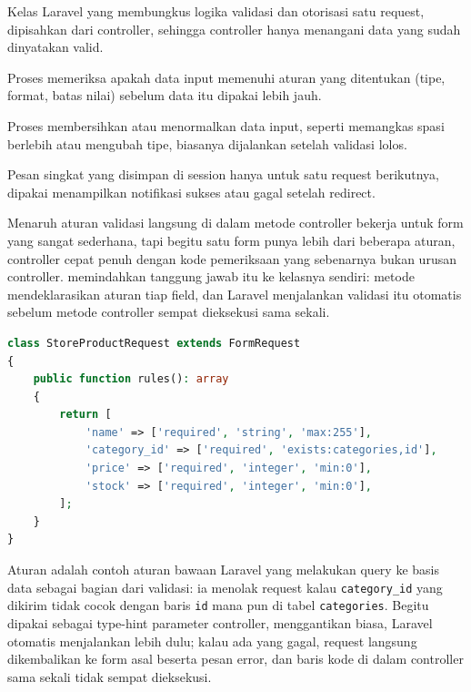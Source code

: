 \begin{istilahpenting}
\begin{description}[leftmargin=0pt,style=nextline]
  \item[FormRequest] Kelas Laravel yang membungkus logika validasi dan otorisasi satu request, dipisahkan dari controller, sehingga controller hanya menangani data yang sudah dinyatakan valid.
  \item[Validasi] Proses memeriksa apakah data input memenuhi aturan yang ditentukan (tipe, format, batas nilai) sebelum data itu dipakai lebih jauh.
  \item[Sanitasi] Proses membersihkan atau menormalkan data input, seperti memangkas spasi berlebih atau mengubah tipe, biasanya dijalankan setelah validasi lolos.
  \item[Flash Message] Pesan singkat yang disimpan di session hanya untuk satu request berikutnya, dipakai menampilkan notifikasi sukses atau gagal setelah redirect.
\end{description}
\end{istilahpenting}

Menaruh aturan validasi langsung di dalam metode controller bekerja
untuk form yang sangat sederhana, tapi begitu satu form punya lebih dari
beberapa aturan, controller cepat penuh dengan kode pemeriksaan yang
sebenarnya bukan urusan controller.  memindahkan
tanggung jawab itu ke kelasnya sendiri: metode 
mendeklarasikan aturan tiap field, dan Laravel menjalankan validasi itu
otomatis sebelum metode controller sempat dieksekusi sama sekali.

\begin{lstlisting}[language=php, title=\lstfile{app/Http/Requests/StoreProductRequest.php}]
class StoreProductRequest extends FormRequest
{
    public function rules(): array
    {
        return [
            'name' => ['required', 'string', 'max:255'],
            'category_id' => ['required', 'exists:categories,id'],
            'price' => ['required', 'integer', 'min:0'],
            'stock' => ['required', 'integer', 'min:0'],
        ];
    }
}
\end{lstlisting}

Aturan  adalah contoh aturan bawaan
Laravel yang melakukan query ke basis data sebagai bagian dari
validasi: ia menolak request kalau \texttt{category\_id} yang dikirim
tidak cocok dengan baris \texttt{id} mana pun di tabel
\texttt{categories}. Begitu  dipakai
sebagai type-hint parameter controller, menggantikan 
biasa, Laravel otomatis menjalankan  lebih dulu; kalau
ada yang gagal, request langsung dikembalikan ke form asal beserta pesan
error, dan baris kode di dalam controller sama sekali tidak sempat
dieksekusi.


